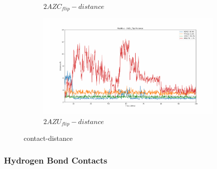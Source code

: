 \documentclass[fleqn,10pt]{wlscirep}
\begin{document}
\begin{figure}[!ht]
\begin{subfigure}{.45\textwidth}
     \caption{$2AZC_{flip}-distance$}
     \label{fig:2AZC_flip-dist}
   \end{subfigure}
    \begin{subfigure}{.45\textwidth}
     \centering
     \includegraphics[width=.95\linewidth]{2AZU_flip/2AZU_flip-dist_4.pdf}
     \caption{$2AZU_{flip}-distance$}
     \label{fig:2AZU_flip-dist}
   \end{subfigure}
\caption{contact-distance}
\label{fig:contact-distance}
\end{figure}

\subsubsection{Hydrogen Bond Contacts}
\end{document}
